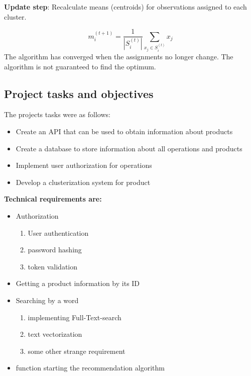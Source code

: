 \documentclass[twoside,twocolumn]{article}
\begin{document}
\textbf{Update step}: Recalculate means (centroids) for observations assigned to each cluster.

\begin{equation}
m_{i}^{(t+1)}=\frac{1}{\left|S_{i}^{(t)}\right|} \sum_{x_{j} \in S_{i}^{(t)}} x_{j}
\end{equation}
The algorithm has converged when the assignments no longer change. The algorithm is not guaranteed to find the optimum.



\subsection{Project tasks and objectives}

The projects tasks were as follows:

\begin{itemize}

\item Create an API that can be used to obtain information about
products
\item Create a database to store information about all operations and
products
\item Implement user authorization for operations
\item Develop a clusterization system for product

\end{itemize}

\textbf{Technical requirements are:}

\begin{itemize}
    \item Authorization
    \begin{enumerate}
        \item User authentication
        \item password hashing
        \item token validation
    \end{enumerate}
    \item Getting a product information by its ID
    \item Searching by a word 
    \begin{enumerate}
        \item implementing Full-Text-search
        \item text vectorization
        \item some other strange requirement
    \end{enumerate}
    \item function starting the recommendation algorithm
\end{itemize}
\end{document}

